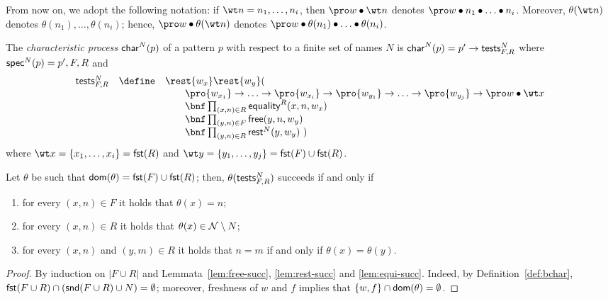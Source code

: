 \documentclass{LMCS}
\begin{document}
From now on, we adopt the following notation: if $\wt n = n_1,\ldots,n_i$, then $\pro w \bullet \wt n$
denotes $\pro w \bullet n_1 \bullet \ldots \bullet n_i$. Moreover, $\theta(\wt n)$ denotes
$\theta(n_1),\ldots,\theta(n_i)$; hence, $\pro w \bullet \theta(\wt n)$ denotes
$\pro w \bullet \theta(n_1) \bullet \ldots \bullet \theta(n_i)$.

\begin{defi}
\label{def:char}
The {\em characteristic process} ${\sf char}^{N}(p)$ of a pattern $p$ with respect to a finite set of names $N$ is ${\sf char}^N(p)=p'\to {\sf tests}^N_{F,R}$ where ${\sf spec}^{N}(p)=p',F,R$ and 
\begin{equation*}
\begin{array}{rcll}
{\sf tests}^N_{F,R} &\define& \rest {w_x} \rest {w_y}(\\
& & \qquad\pro {w_{x_1}}\to\ldots\to\pro{w_{x_i}}\to\pro {w_{y_1}}\to\ldots\to\pro {w_{y_j}}\to\pro w\bullet \wt x\\
& & \qquad\bnf \prod_{(x,n)\in R} {\sf equality}^R(x,n,w_x)\\
& & \qquad\bnf \prod_{(y,n)\in F} {\sf free}(y,n,w_y)\\
& & \qquad\bnf \prod_{(y,n)\in R} {\sf rest}^N(y,w_y)\ )
\end{array}
\end{equation*}
where $\wt x = \{x_1,\ldots,x_i\} = {\sf fst}(R)$ and
$\wt y = \{y_1,\ldots,y_j\} = {\sf fst}(F)\cup {\sf fst}(R)$.
\end{defi}


\begin{lem}
\label{lem:theta-charP}
Let $\theta$ be such that ${\sf dom}(\theta) = {\sf fst}(F) \cup {\sf fst}(R)$; then,
$\theta({\sf tests}^N_{F,R})$ succeeds if and only if
\begin{enumerate}
\item for every $(x,n) \in F$ it holds that $\theta(x) = n$;
\item for every $(x,n) \in R$ it holds that $\theta(x) \in {\cal N}\setminus N$;
\item for every $(x,n)$ and $(y,m) \in R$ it holds that $n=m$ if and only if $\theta(x)=\theta(y)$.
\end{enumerate}
\end{lem}
\begin{proof}
By induction on $|F \cup R|$ and Lemmata~\ref{lem:free-succ},
\ref{lem:rest-succ} and \ref{lem:equi-succ}. Indeed, by Definition~\ref{def:bchar},
${\sf fst}(F \cup R) \cap ({\sf snd}(F\cup R) \cup N) = \emptyset$; moreover, freshness of
$w$ and $f$ implies that $\{w,f\} \cap {\sf dom}(\theta) = \emptyset$.
\end{proof}
\end{document}
